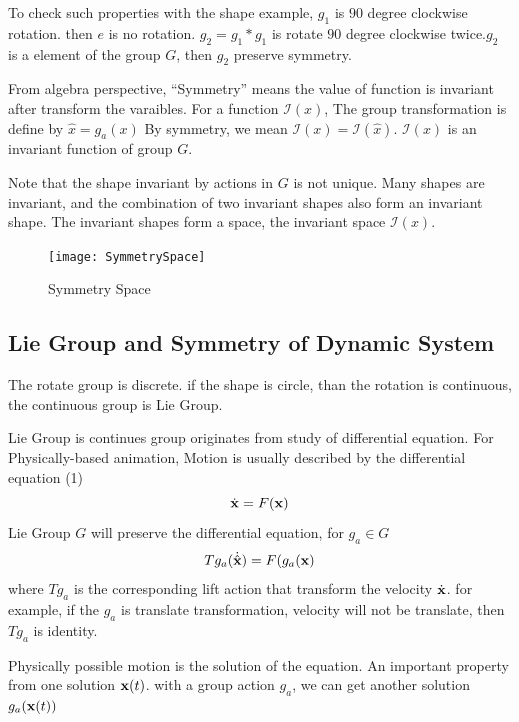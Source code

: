 To check such properties with the shape example, $g_1$ is  $90$ degree clockwise rotation. then $e$ is no rotation.
$g_2=g_1*g_1$ is rotate $90$ degree clockwise twice.$g_2$ is a element of the group $G$, then $g_2$ preserve symmetry.


From algebra perspective, ``Symmetry'' means the value of function is invariant after transform the varaibles.
For a function $\mathcal{I}(x)$,
The group transformation is define by $\hat{x}=g_a(x)$
By symmetry, we mean $\mathcal{I}(x)=\mathcal{I}(\hat{x})$.
$\mathcal{I}(x)$ is an invariant function of group $G$.

Note that  the shape invariant by actions in $G$ is not unique.
Many shapes are invariant, and the combination of two invariant shapes also form an invariant shape. 
The invariant shapes form a space, the invariant space $\mathcal{I}(x)$.


\begin{figure}[!htbp]
  \begin{center}
    \texttt{[image: SymmetrySpace]}
    \caption{Symmetry Space}
    \label{fig:symmetry Space}
\end{center}
\end{figure}





\subsection{Lie Group and Symmetry of Dynamic System}
The rotate group is discrete.
if the shape is circle, than the rotation is continuous, the continuous group is Lie Group.

Lie Group is continues group originates from study of differential equation.
For Physically-based animation,
Motion is usually described by the differential equation (1)
\begin{equation}
	\dot{\mathbf{x}}=F(\mathbf{x})
\end{equation}
Lie Group $G$ will preserve the differential equation, for $g_a \in G$ 
\[
Tg_a(\dot{\hat{\mathbf{x}}})=F(g_a(\mathbf{x})
\]
where $Tg_a$ is the corresponding lift action that transform the velocity $\dot{\mathbf{x}}$.
for example, if the $g_a$ is translate transformation, velocity will not be translate, then $Tg_a$ is identity.





Physically possible motion is the solution of the equation.
An important property from one solution $\mathbf{x}(t)$.
with a group action $g_a$, we can get another solution $g_a(\mathbf{x}(t))$
 	
